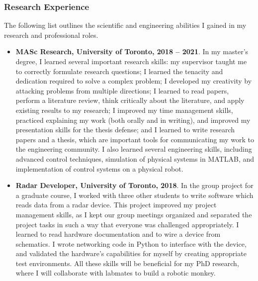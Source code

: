 \documentclass[a4paper,12pt]{article}
\begin{document}
\subsubsection*{Research Experience}
The following list outlines the scientific and engineering abilities I gained in
my research and professional roles.
\begin{itemize}
    \item \textbf{MASc Research, University of Toronto, 2018 -- 2021}.
        In my master's degree, I learned several important research skills:
        my supervisor taught me to correctly formulate research questions;
        I learned the tenacity and dedication required to solve a
        complex problem; I developed my creativity by attacking problems from
        multiple directions; I learned to read papers, perform a literature
        review, think critically about the literature, and apply existing
        results to my research; I improved my time management skills, practiced
        explaining my work (both orally and in writing), and improved my
        presentation skills for the thesis defense; and I learned to write
        research papers and a thesis, which are important tools for communicating my
        work to the engineering community.
        I also learned several engineering skills, including advanced control
        techniques, simulation of physical systems in MATLAB, and implementation
        of control systems on a physical robot.

    \item \textbf{Radar Developer, University of Toronto, 2018}.
        In the group project for a graduate course, I worked with three other
        students to write software which reads data from a radar device.
        This project improved my project management skills, as I kept our group
        meetings organized and separated the project tasks in such a way
        that everyone was challenged appropriately.
        I learned to read hardware documentation and to wire a device from
        schematics.
        I wrote networking code in Python to interface with the
        device, and validated the hardware's capabilities for myself by
        creating appropriate test environments. 
        All these skills will be beneficial for my PhD research, where I will
        collaborate with labmates to build a robotic monkey.


\end{itemize}
\end{document}
